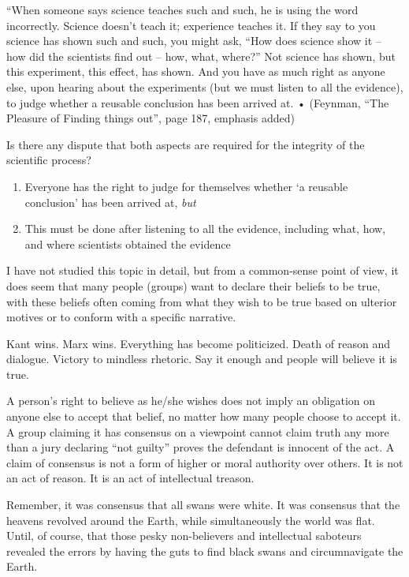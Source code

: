 “When someone says science teaches such and such, he is using the word incorrectly. Science doesn’t teach it; experience teaches it. If they say to you science has shown such and such, you might ask, “How does science show it – how did the scientists find out – how, what, where?”  Not science has shown, but this experiment, this effect, has shown. And you have as much right as anyone else, upon hearing about the experiments (but we must listen to all the evidence), to judge whether a reusable conclusion has been arrived at.
    • (Feynman, “The Pleasure of Finding things out”, page 187, emphasis added)
    
Is there any dispute that both aspects are required for the integrity of the scientific process?

\begin{enumerate}
\item Everyone has the right to judge for themselves whether `a reusable conclusion’ has been arrived at, \textit{but}
\item This must be done after listening to all the evidence, including what, how, and where scientists obtained the evidence
\end{enumerate}

I have not studied this topic in detail, but from a common-sense point of view, it does seem that many people (groups) want to declare their beliefs to be true, with these beliefs often coming from what they wish to be true based on ulterior motives or to conform with a specific narrative.

Kant wins. Marx wins. Everything has become politicized. Death of reason and dialogue. Victory to mindless rhetoric. Say it enough and people will believe it is true.

A person’s right to believe as he/she wishes does not imply an obligation on anyone else to accept that belief, no matter how many people choose to accept it. A group claiming it has consensus on a viewpoint cannot claim truth any more than a jury declaring “not guilty” proves the defendant is innocent of the act. A claim of consensus is not a form of higher or moral authority over others. It is not an act of reason. It is an act of intellectual treason.

Remember, it was consensus that all swans were white. It was consensus that the heavens revolved around the Earth, while simultaneously the world was flat. Until, of course, that those pesky non-believers and intellectual saboteurs revealed the errors by having the guts to find black swans and circumnavigate the Earth.

